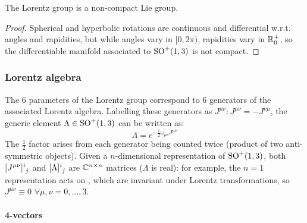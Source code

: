 \begin{theorem}{}{}
  The Lorentz group is a non-compact Lie group.
\end{theorem}

\begin{proofbox}
  \begin{proof}
    Spherical and hyperbolic rotations are continuous and differential w.r.t. angles and rapidities, but while angles vary in $ [0, 2\pi) $, rapidities vary in $ \mathbb{R}^+_0 $, so the differentiable manifold associated to $ \mathrm{SO}^+(1,3) $ is not compact.
  \end{proof}
\end{proofbox}

\subsubsection{Lorentz algebra}

The 6 parameters of the Lorentz group correspond to 6 generators of the associated Lorentz algebra. Labelling these generators as $ J^{\mu \nu} : J^{\mu \nu} = - J^{\nu \mu} $, the generic element $ \Lambda \in \mathrm{SO}^+(1,3) $ can be written as:
\begin{equation}
  \Lambda = e^{- \frac{i}{2} \omega_{\mu \nu} J^{\mu \nu}}
  \label{eq:lor-om}
\end{equation}
The $ \frac{1}{2} $ factor arises from each generator being counted twice (product of two anti-symmetric objects). Given a $ n $-dimensional representation of $ \mathrm{SO}^+(1,3) $, both $ \tensor{[J^{\mu \nu}]}{^i_j} $ and $ \tensor{[\Lambda]}{^i_j} $ are $ \mathbb{C}^{n \times n} $ matrices ($ \Lambda $ is real): for example, the $ n = 1 $ representation acts on , which are invariant under Lorentz transformations, so $ J^{\mu \nu} \equiv 0 \,\,\forall \mu,\nu = 0, \dots, 3 $.

\paragraph{4-vectors}

